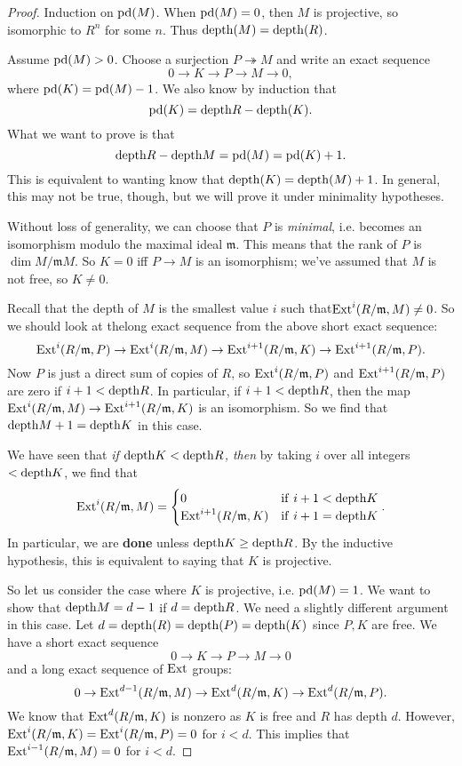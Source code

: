 \begin{proof} 
Induction on $\mathrm{pd}(M)$. When $\mathrm{pd}(M)=0$, then $M$ is projective,
so isomorphic
to $R^n$ for some $n$. Thus $\mathrm{depth}(M) = \mathrm{depth}(R)$. 

Assume $\mathrm{pd}(M) > 0$.
Choose a surjection $P \twoheadrightarrow M$ and write an exact
sequence
\[ 0 \to K \to P \to M \to 0,  \]
where $\mathrm{pd}(K) = \mathrm{pd}(M)-1$. We also know by induction that
\[ \mathrm{pd}(K) = \mathrm{depth} R - \mathrm{depth}(K).  \]
What we want to prove is that 
\[ \mathrm{depth} R - \mathrm{depth} M = \mathrm{pd}(M) = \mathrm{pd}(K)+1.  \]
This is equivalent to wanting know that $\mathrm{depth}(K) = \mathrm{depth} (M)
+1$.
In general, this may not be true, though, but we will prove it
under
minimality hypotheses.

Without loss of generality, we can choose that $P$ is
\emph{minimal}, i.e.
becomes an isomorphism modulo the maximal ideal $\mathfrak{m}$.
This means
that the rank of $P$ is $\dim M/\mathfrak{m}M$.
So $K = 0$ iff $P \to M$ is an isomorphism; we've assumed that
$M$ is not
free, so $K \neq 0$.

Recall that the depth of $M$ is the smallest value $i$ such
that$\mathrm{Ext}^i(R/\mathfrak{m}, M) \neq 0$. So we should look at thelong exact
sequence from the above short exact sequence:
\[ \mathrm{Ext}^i(R/\mathfrak{m}, P) \to  \mathrm{Ext}^i(R/\mathfrak{m},M)  \to
\mathrm{Ext}^{i+1}(R/\mathfrak{m}, K) \to \mathrm{Ext}^{i+1}(R/\mathfrak{m},
P).\]
Now $P$ is just a direct sum of copies of $R$, so
$\mathrm{Ext}^i(R/\mathfrak{m}, P)$
and $\mathrm{Ext}^{i+1}(R/\mathfrak{m}, P)$ are zero if $i+1< \mathrm{depth} R$.
In
particular, if $i+1< \mathrm{depth} R$, then the map $
\mathrm{Ext}^i(R/\mathfrak{m},M) \to
\mathrm{Ext}^{i+1}(R/\mathfrak{m}, K) $ is an isomorphism.
So we find that $\mathrm{depth} M + 1 = \mathrm{depth} K$ in this case.

We have seen that \emph{if $\mathrm{depth} K < \mathrm{depth} R$, then } by
taking $i$ over
all integers $< \mathrm{depth} K$, we find that
\[ \mathrm{Ext}^{i}(R/\mathfrak{m}, M) = \begin{cases} 
0 & \mathrm{if \ } i+1 < \mathrm{depth} K \\
\mathrm{Ext}^{i+1}(R/\mathfrak{m},K) & \mathrm{if \ } i+1 = \mathrm{depth} K
\end{cases}. \]
In particular, we are \textbf{done} unless $\mathrm{depth} K \geq \mathrm{depth}
R$.
By the inductive hypothesis, this is equivalent to saying that
$K$ is
projective. 

So let us consider the case where $K$ is projective, i.e.
$\mathrm{pd}(M)=1$.
We want to show that $\mathrm{depth} M = d-1$ if $d = \mathrm{depth} R$.
We need a
slightly different argument in this case. Let $d = \mathrm{depth}(R) =
\mathrm{depth} (P) =
\mathrm{depth}(K)$ since $P,K$ are free. We have a short exact sequence
\[ 0 \to K \to P \to M \to 0  \]
and a long exact sequence of $\mathrm{Ext}$ groups:
\[ 0 \to \mathrm{Ext}^{d-1}(R/\mathfrak{m}, M) \to
\mathrm{Ext}^d(R/\mathfrak{m}, K) \to \mathrm{Ext}^d(R/\mathfrak{m}, P) .\]
We know that $\mathrm{Ext}^d(R/\mathfrak{m}, K)$ is nonzero as $K$ is
free and $R$ has
depth $d$. However, $\mathrm{Ext}^i(R/\mathfrak{m}, K) =
\mathrm{Ext}^i(R/\mathfrak{m}, P)=0$
for $i<d$. This implies that $\mathrm{Ext}^{i-1}(R/\mathfrak{m}, M)=0$
for $i<d$.


\end{proof}
